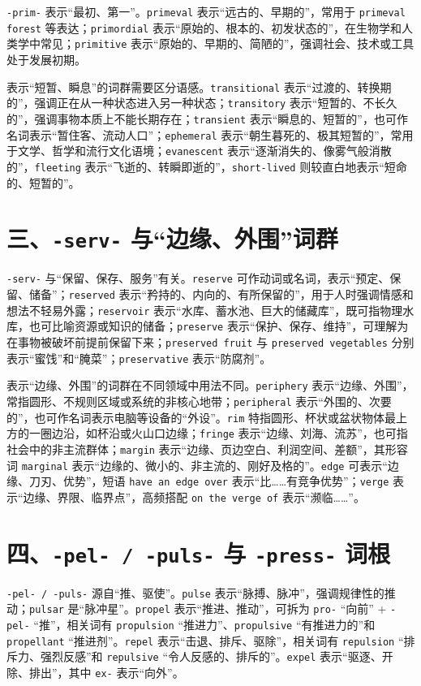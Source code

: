 \documentclass[UTF8,zihao=-4]{ctexart}
\begin{document}
\texttt{-prim-} 表示“最初、第一”。\texttt{primeval} 表示“远古的、早期的”，常用于 \texttt{primeval forest} 等表达；\texttt{primordial} 表示“原始的、根本的、初发状态的”，在生物学和人类学中常见；\texttt{primitive} 表示“原始的、早期的、简陋的”，强调社会、技术或工具处于发展初期。

表示“短暂、瞬息”的词群需要区分语感。\texttt{transitional} 表示“过渡的、转换期的”，强调正在从一种状态进入另一种状态；\texttt{transitory} 表示“短暂的、不长久的”，强调事物本质上不能长期存在；\texttt{transient} 表示“瞬息的、短暂的”，也可作名词表示“暂住客、流动人口”；\texttt{ephemeral} 表示“朝生暮死的、极其短暂的”，常用于文学、哲学和流行文化语境；\texttt{evanescent} 表示“逐渐消失的、像雾气般消散的”，\texttt{fleeting} 表示“飞逝的、转瞬即逝的”，\texttt{short-lived} 则较直白地表示“短命的、短暂的”。

\section*{三、\texttt{-serv-} 与“边缘、外围”词群}

\texttt{-serv-} 与“保留、保存、服务”有关。\texttt{reserve} 可作动词或名词，表示“预定、保留、储备”；\texttt{reserved} 表示“矜持的、内向的、有所保留的”，用于人时强调情感和想法不轻易外露；\texttt{reservoir} 表示“水库、蓄水池、巨大的储藏库”，既可指物理水库，也可比喻资源或知识的储备；\texttt{preserve} 表示“保护、保存、维持”，可理解为在事物被破坏前提前保留下来；\texttt{preserved fruit} 与 \texttt{preserved vegetables} 分别表示“蜜饯”和“腌菜”；\texttt{preservative} 表示“防腐剂”。

表示“边缘、外围”的词群在不同领域中用法不同。\texttt{periphery} 表示“边缘、外围”，常指圆形、不规则区域或系统的非核心地带；\texttt{peripheral} 表示“外围的、次要的”，也可作名词表示电脑等设备的“外设”。\texttt{rim} 特指圆形、杯状或盆状物体最上方的一圈边沿，如杯沿或火山口边缘；\texttt{fringe} 表示“边缘、刘海、流苏”，也可指社会中的非主流群体；\texttt{margin} 表示“边缘、页边空白、利润空间、差额”，其形容词 \texttt{marginal} 表示“边缘的、微小的、非主流的、刚好及格的”。\texttt{edge} 可表示“边缘、刀刃、优势”，短语 \texttt{have an edge over} 表示“比……有竞争优势”；\texttt{verge} 表示“边缘、界限、临界点”，高频搭配 \texttt{on the verge of} 表示“濒临……”。

\section*{四、\texttt{-pel- / -puls-} 与 \texttt{-press-} 词根}

\texttt{-pel- / -puls-} 源自“推、驱使”。\texttt{pulse} 表示“脉搏、脉冲”，强调规律性的推动；\texttt{pulsar} 是“脉冲星”。\texttt{propel} 表示“推进、推动”，可拆为 \texttt{pro-} “向前” + \texttt{-pel-} “推”，相关词有 \texttt{propulsion} “推进力”、\texttt{propulsive} “有推进力的”和 \texttt{propellant} “推进剂”。\texttt{repel} 表示“击退、排斥、驱除”，相关词有 \texttt{repulsion} “排斥力、强烈反感”和 \texttt{repulsive} “令人反感的、排斥的”。\texttt{expel} 表示“驱逐、开除、排出”，其中 \texttt{ex-} 表示“向外”。
\end{document}
